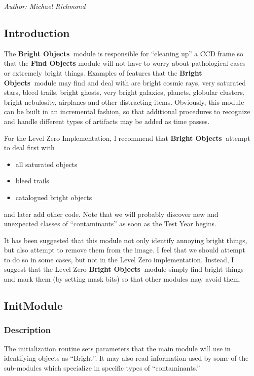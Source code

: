 
\def \bom{{\bf Bright Objects\ }}

\medskip
\centerline{\it Author: Michael Richmond}
\medskip

\subsection {Introduction}

  The \bom module is responsible for ``cleaning up'' a CCD frame
so that the {\bf Find Objects} module will not have to worry about
pathological cases or extremely bright things.  Examples of 
features that the \bom module may find and deal with are bright
cosmic rays, very saturated stars, bleed trails, bright ghosts,
very bright galaxies, planets, globular clusters, bright nebulosity,
airplanes and other distracting items.  Obviously, this module can
be built in an incremental fashion, so that additional procedures
to recognize and handle different types of artifacts may be added
as time passes.

  For the Level Zero Implementation, I recommend that \bom attempt
to deal first with

\begin{itemize}
  \item all saturated objects
  \item bleed trails
  \item catalogued bright objects
\end{itemize}

and later add other code.  Note that we will probably discover new
and unexpected classes of ``contaminants'' as soon as the Test
Year begins.

  It has been suggested that this module not only identify annoying
bright things, but also attempt to remove them from the image.
I feel that we should attempt to do so in some cases, but not in the
Level Zero implementation.  Instead, I suggest that the Level Zero
\bom module simply find bright things and mark them (by setting mask
bits) so that other modules may avoid them.

\subsection {InitModule}

\subsubsection {Description}

  The initialization routine sets parameters that the main module will
use in identifying objects as ``Bright''.  It may also read information
used by some of the sub-modules which specialize in specific types of
``contaminants.''

